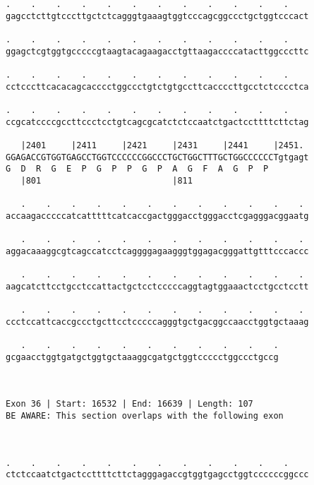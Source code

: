 \documentclass{article}
\begin{document}
\begin{Verbatim}
.    .    .    .    .    .    .    .    .    .    .    .    
gagcctcttgtcccttgctctcagggtgaaagtggtcccagcggccctgctggtcccact
                                                            
.    .    .    .    .    .    .    .    .    .    .    .    
ggagctcgtggtgcccccgtaagtacagaagacctgttaagaccccatacttggcccttc
                                                            
.    .    .    .    .    .    .    .    .    .    .    .    
cctcccttcacacagcacccctggccctgtctgtgccttcaccccttgcctctcccctca
                                                            
.    .    .    .    .    .    .    .    .    .    .    .    
ccgcatccccgccttccctcctgtcagcgcatctctccaatctgactccttttcttctag
                                                            
   |2401     |2411     |2421     |2431     |2441     |2451. 
GGAGACCGTGGTGAGCCTGGTCCCCCCGGCCCTGCTGGCTTTGCTGGCCCCCCTgtgagt
G  D  R  G  E  P  G  P  P  G  P  A  G  F  A  G  P  P        
   |801                          |811                       
  
   .    .    .    .    .    .    .    .    .    .    .    . 
accaagacccccatcatttttcatcaccgactgggacctgggacctcgagggacggaatg
                                                            
   .    .    .    .    .    .    .    .    .    .    .    . 
aggacaaaggcgtcagccatcctcaggggagaagggtggagacgggattgtttcccaccc
                                                            
   .    .    .    .    .    .    .    .    .    .    .    . 
aagcatcttcctgcctccattactgctcctcccccaggtagtggaaactcctgcctcctt
                                                            
   .    .    .    .    .    .    .    .    .    .    .    . 
ccctccattcaccgccctgcttcctcccccagggtgctgacggccaacctggtgctaaag
                                                            
   .    .    .    .    .    .    .    .    .    .    .
gcgaacctggtgatgctggtgctaaaggcgatgctggtccccctggccctgccg
                                                      
                                                      
 
Exon 36 | Start: 16532 | End: 16639 | Length: 107
BE AWARE: This section overlaps with the following exon



.    .    .    .    .    .    .    .    .    .    .    .    
ctctccaatctgactccttttcttctagggagaccgtggtgagcctggtccccccggccc
                                                            

\end{Verbatim}
\end{document}
